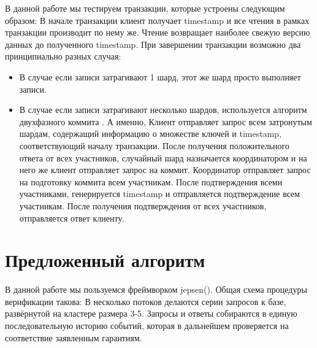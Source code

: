 \documentclass[pdftex,ptm,14pt,a4paper]{extreport}
\theoremstyle{definition}
\begin{document}
В данной работе мы тестируем транзакции, которые устроены следующим образом:
В начале транзакции клиент получает timestamp и все чтения в рамках транзакции
производит по нему же. Чтение возвращает наиболее свежую версию данных до полученного
timestamp. При завершении транзакции возможно два принципиально разных случая:
\begin{itemize}
    \item В случае если записи затрагивают 1 шард, этот же шард просто выполняет записи.
    \item В случае если записи затрагивают несколько шардов, используется алгоритм
        двухфазного коммита \cite{tanenbaum2007distributed}.
        А именно,
        \subitem Клиент отправляет запрос всем затронутым шардам, содержащий информацию
            о множестве ключей и timestamp, соответствующий началу транзакции.
        \subitem После получения положительного ответа от всех участников,
            случайный шард назначается координатором и на него же клиент отправляет
            запрос на коммит.
        \subitem Координатор отправляет запрос на подготовку коммита всем участникам.
        \subitem После подтверждения всеми участниками, генерируется timestamp и
            отправляется подтверждение всем участникам.
        \subitem После получения подтверждения от всех участников, отправляется ответ клиенту.
\end{itemize}

\chapter{Предложенный алгоритм}
В данной работе мы пользуемся фреймворком jepsen(\cite{jepsen-io}).
Общая схема процедуры верификации такова:
В несколько потоков делаются серии запросов к базе, развёрнутой на кластере размера 3-5.
Запросы и ответы собираются в единую последовательную историю событий, которая в дальнейшем
 проверяется на соответствие заявленным гарантиям.
\end{document}
